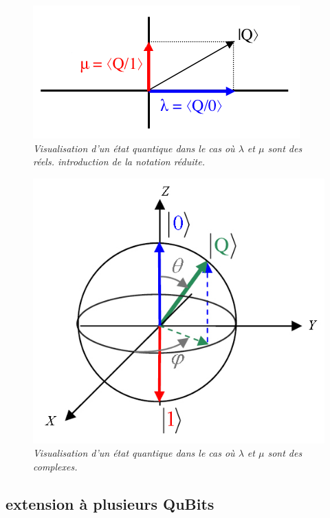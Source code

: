 \documentclass[a4paper,12pt]{report}
\begin{document}
\begin{figure}
	\begin{center}
		\includegraphics[scale=0.60]{images/reels}
	\end{center}
	\caption{\textit{Visualisation d'un état quantique dans le cas où $\lambda$ et $\mu$ sont des réels. introduction de la notation réduite.}}
	\label{reels}
\end{figure}

\begin{figure}
	\begin{center}
		\includegraphics[scale=0.60]{images/bloch}
	\end{center}
	\caption{\textit{Visualisation d'un état quantique dans le cas où $\lambda$ et $\mu$ sont des complexes.}}
	\label{bloch}
\end{figure}

		\subsection{extension à plusieurs QuBits}
\end{document}
